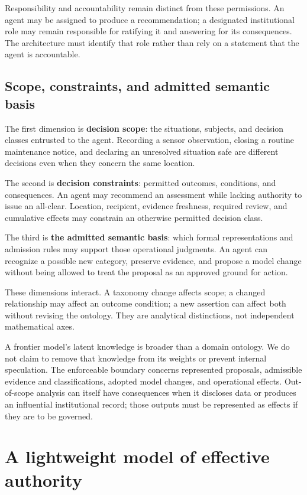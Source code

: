 \documentclass[
  english,
  12pt,
  a4paper,
  preprint,
  numbers,
  nopreprintline]{elsarticle}
\begin{document}
Responsibility and accountability remain distinct from these
permissions. An agent may be assigned to produce a recommendation; a
designated institutional role may remain responsible for ratifying it
and answering for its consequences. The architecture must identify that
role rather than rely on a statement that the agent is accountable.

\subsection{Scope, constraints, and admitted semantic
basis}\label{scope-constraints-and-admitted-semantic-basis}

The first dimension is \textbf{decision scope}: the situations,
subjects, and decision classes entrusted to the agent. Recording a
sensor observation, closing a routine maintenance notice, and declaring
an unresolved situation safe are different decisions even when they
concern the same location.

The second is \textbf{decision constraints}: permitted outcomes,
conditions, and consequences. An agent may recommend an assessment while
lacking authority to issue an all-clear. Location, recipient, evidence
freshness, required review, and cumulative effects may constrain an
otherwise permitted decision class.

The third is \textbf{the admitted semantic basis}: which formal
representations and admission rules may support those operational
judgments. An agent can recognize a possible new category, preserve
evidence, and propose a model change without being allowed to treat the
proposal as an approved ground for action.

These dimensions interact. A taxonomy change affects scope; a changed
relationship may affect an outcome condition; a new assertion can affect
both without revising the ontology. They are analytical distinctions,
not independent mathematical axes.

A frontier model's latent knowledge is broader than a domain ontology.
We do not claim to remove that knowledge from its weights or prevent
internal speculation. The enforceable boundary concerns represented
proposals, admissible evidence and classifications, adopted model
changes, and operational effects. Out-of-scope analysis can itself have
consequences when it discloses data or produces an influential
institutional record; those outputs must be represented as effects if
they are to be governed.

\section{A lightweight model of effective
authority}\label{a-lightweight-model-of-effective-authority}
\end{document}
